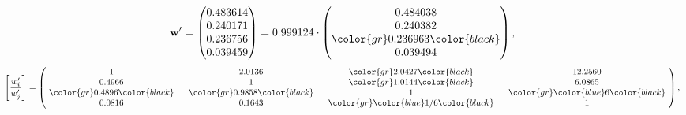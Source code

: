 \begin{example}
\begin{equation*}
\mathbf{w}^{\prime} =
\begin{pmatrix}
0.483614\\
0.240171\\
0.236756\\
0.039459
\end{pmatrix} =
0.999124\cdot
\begin{pmatrix}
0.484038\\
0.240382\\
\color{gr} 0.236963\color{black} \\
0.039494
\end{pmatrix},
\end{equation*}
\begin{equation*}
\left[ \frac{{w}^{\prime}_i}{{w}^{\prime}_j} \right] =
\begin{pmatrix}
$\,\,$ 1 $\,\,$ & $\,\,$2.0136$\,\,$ & $\,\,$\color{gr} 2.0427\color{black} $\,\,$ & $\,\,$12.2560$\,\,$ \\
$\,\,$0.4966$\,\,$ & $\,\,$ 1 $\,\,$ & $\,\,$\color{gr} 1.0144\color{black} $\,\,$ & $\,\,$6.0865  $\,\,$ \\
$\,\,$\color{gr} 0.4896\color{black} $\,\,$ & $\,\,$\color{gr} 0.9858\color{black} $\,\,$ & $\,\,$ 1 $\,\,$ & $\,\,$\color{gr} \color{blue} 6\color{black}  $\,\,$ \\
$\,\,$0.0816$\,\,$ & $\,\,$0.1643$\,\,$ & $\,\,$\color{gr} \color{blue}  1/6\color{black} $\,\,$ & $\,\,$ 1  $\,\,$ \\
\end{pmatrix},
\end{equation*}
\end{example}
\newpage
